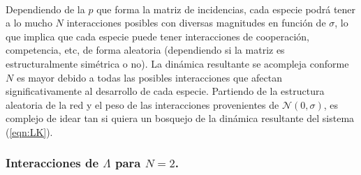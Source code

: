 \\
Dependiendo de la $p$ que forma la matriz de incidencias, cada especie podrá tener a lo mucho $N$ interacciones posibles con diversas magnitudes en función de $\sigma$, lo que implica que cada especie puede tener interacciones de cooperación, competencia, etc, de forma aleatoria (dependiendo si la matriz es estructuralmente simétrica o no). La dinámica resultante se acompleja conforme $N$ es mayor debido a todas las posibles interacciones que afectan significativamente al desarrollo de cada especie. Partiendo de la estructura aleatoria de la red y el peso de las interacciones provenientes de $\mathcal{N}(0,\sigma)$, es complejo de idear tan si quiera un bosquejo de la dinámica resultante del sistema (\ref{eqn:LK}).

\subsubsection*{Interacciones de $\Lambda$ para $N=2$.}

